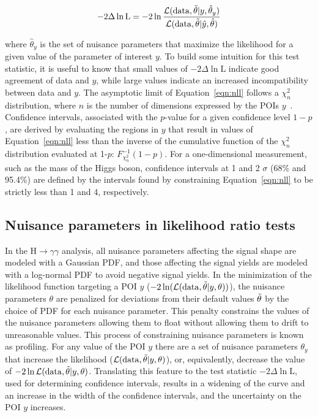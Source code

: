 \begin{equation}
    -2 \Delta \ln \mathrm{L} = -2 \ln \frac{\mathcal{L}(\mathrm{data}, \Tilde{\theta}| y, \hat{\theta}_y)}{\mathcal{L}(\mathrm{data}, \Tilde{\theta}| \hat{y}, \hat{\theta})}
    \label{eqn:nll}
\end{equation}

\noindent where $\hat{\theta}_y$ is the set of nuisance parameters that maximize the likelihood for a given value of the parameter of interest $y$. To build some intuition for this test statistic, it is useful to know that small values of $-2 \Delta\ln\mathrm{L}$ indicate good agreement of data and $y$, while large values indicate an increased incompatibility between data and $y$. The asymptotic limit of Equation~\ref{eqn:nll} follows a $\chi_n^2$ distribution, where $n$ is the number of dimensions expressed by the POIs $y$~\cite{cowan_cranmer_gross_vitells_2011}. Confidence intervals, associated with the $p$-value for a given confidence level $1-p$, are derived by evaluating the regions in $y$ that result in values of Equation~\ref{eqn:nll} less than the inverse of the cumulative function of the $\chi^2_n$ distribution evaluated at 1-$p$: $F_{\chi^2_n}^{-1}(1-p)$. For a one-dimensional measurement, such as the mass of the Higgs boson, confidence intervals at 1 and 2 $\sigma$ (68\% and 95.4\%) are defined by the intervals found by constraining Equation~\ref{eqn:nll} to be strictly less than 1 and 4, respectively. 

\subsection{Nuisance parameters in likelihood ratio tests}
\label{subsec:nuisance}

In the H$\rightarrow\gamma\gamma$ analysis, all nuisance parameters affecting the signal shape are modeled with a Gaussian PDF, and those affecting the signal yields are modeled with a log-normal PDF to avoid negative signal yields. In the minimization of the likelihood function targeting a POI $y$ ($-2\ln(\mathcal{L}(\mathrm{data},\Tilde{\theta}| y, \theta))$), the nuisance parameters $\theta$ are penalized for deviations from their default values $\Tilde{\theta}$ by the choice of PDF for each nuisance parameter. This penalty constrains the values of the nuisance parameters allowing them to float without allowing them to drift to unreasonable values. This process of constraining nuisance parameters is known as profiling. For any value of the POI $y$ there are a set of nuisance parameters $\theta_y$ that increase the likelihood ($\mathcal{L}(\mathrm{data},\Tilde{\theta}| y, \theta)$), or, equivalently, decrease the value of $-2\ln \mathcal{L}(\mathrm{data},\Tilde{\theta}| y, \theta)$. Translating this feature to the test statistic $-2 \Delta \ln \mathrm{L}$, used for determining confidence intervals, results in a widening of the curve and an increase in the width of the confidence intervals, and the uncertainty on the POI $y$ increases.

